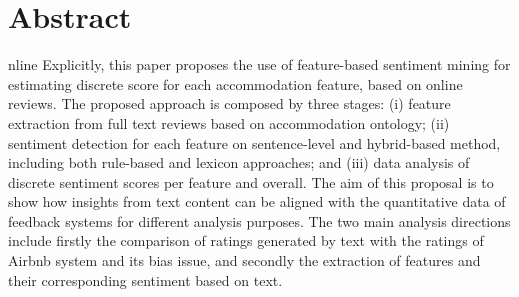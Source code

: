 %
%
%
\let\cleardoublepage\clearpage
\chapter{Abstract}
\begin{SingleSpace}

nline {\color{red}{reviews are an important source for both customers, to obtaining information before making purchase decisions, and businesses to improve the quality of their services. Opinion mining is an active field of research that makes use of Natural Language Processing (NLP) techniques for mining the huge amount of online text reviews. This paper aims to enhance the focus on customers by analyzing their opinions and aligning the results with the quantitative feedback received. The setting of this research is the dataset of Airbnb reviews, a giant online marketplace for vacation rentals. }} Explicitly, this paper proposes the use of feature-based sentiment mining for estimating discrete score for each accommodation feature, based on online reviews. The proposed approach is composed by three stages: (i) feature extraction from full text reviews based on accommodation ontology; (ii) sentiment detection for each feature on sentence-level and hybrid-based method, including both rule-based and lexicon approaches; and (iii) data analysis of discrete sentiment scores per feature and overall. The aim of this proposal is to show how insights from text content can be aligned with the quantitative data of feedback systems for different analysis purposes. The two main analysis directions include firstly the comparison of ratings generated by text with the ratings of Airbnb system and its bias issue, and secondly the extraction of features and their corresponding sentiment based on text. 
\end{SingleSpace}
\clearpage